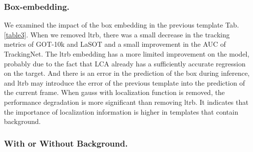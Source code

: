 \documentclass[letterpaper]{article} \usepackage{aaai23}  \usepackage{times}  \usepackage{helvet}  \usepackage{courier}  \usepackage[hyphens]{url}  \usepackage{graphicx} \urlstyle{rm} \def\UrlFont{\rm}  \usepackage{natbib}  \usepackage{caption} \frenchspacing  \setlength{\pdfpagewidth}{8.5in}  \setlength{\pdfpageheight}{11in}  \usepackage{algorithm}
\begin{document}
\subsubsection{Box-embedding.}
We examined the impact of the box embedding in the previous template Tab. \ref{table3}. When we removed ltrb, there was a small decrease in the tracking metrics of GOT-10k and LaSOT and a small improvement in the AUC of TrackingNet. The ltrb embedding has a more limited improvement on the model, probably due to the fact that LCA already has a sufficiently accurate regression on the target. And there is an error in the prediction of the box during inference, and ltrb may introduce the error of the previous template into the prediction of the current frame. When gauss with localization function is removed, the performance degradation is more significant than removing ltrb. It indicates that the importance of localization information is higher in templates that contain background.

\subsubsection{With or Without Background.}
\end{document}
